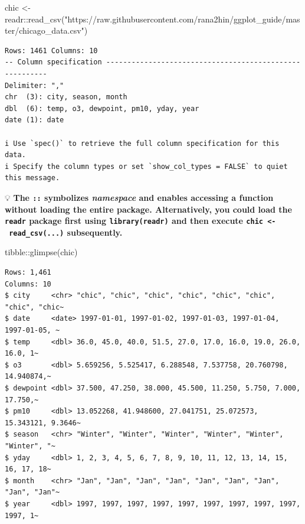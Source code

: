 \documentclass[
  letterpaper,
  DIV=11,
  numbers=noendperiod]{scrreprt}
\newenvironment{Shaded}{\begin{snugshade}}{\end{snugshade}}
\newcommand{\FunctionTok}[1]{\textcolor[rgb]{0.28,0.35,0.67}{#1}}
\newcommand{\NormalTok}[1]{\textcolor[rgb]{0.00,0.23,0.31}{#1}}
\newcommand{\OtherTok}[1]{\textcolor[rgb]{0.00,0.23,0.31}{#1}}
\newcommand{\SpecialCharTok}[1]{\textcolor[rgb]{0.37,0.37,0.37}{#1}}
\newcommand{\StringTok}[1]{\textcolor[rgb]{0.13,0.47,0.30}{#1}}
\begin{document}
\begin{Shaded}
\begin{Highlighting}[]
\NormalTok{chic }\OtherTok{\textless{}{-}}\NormalTok{ readr}\SpecialCharTok{::}\FunctionTok{read\_csv}\NormalTok{(}\StringTok{"https://raw.githubusercontent.com/rana2hin/ggplot\_guide/master/chicago\_data.csv"}\NormalTok{)}
\end{Highlighting}
\end{Shaded}

\begin{verbatim}
Rows: 1461 Columns: 10
-- Column specification --------------------------------------------------------
Delimiter: ","
chr  (3): city, season, month
dbl  (6): temp, o3, dewpoint, pm10, yday, year
date (1): date

i Use `spec()` to retrieve the full column specification for this data.
i Specify the column types or set `show_col_types = FALSE` to quiet this message.
\end{verbatim}

💡 \textbf{The \texttt{::} symbolizes \emph{namespace} and enables
accessing a function without loading the entire package. Alternatively,
you could load the \texttt{readr} package first using
\texttt{library(readr)} and then execute
\texttt{chic\ \textless{}-\ read\_csv(...)} subsequently.}

\begin{Shaded}
\begin{Highlighting}[]
\NormalTok{tibble}\SpecialCharTok{::}\FunctionTok{glimpse}\NormalTok{(chic)}
\end{Highlighting}
\end{Shaded}

\begin{verbatim}
Rows: 1,461
Columns: 10
$ city     <chr> "chic", "chic", "chic", "chic", "chic", "chic", "chic", "chic~
$ date     <date> 1997-01-01, 1997-01-02, 1997-01-03, 1997-01-04, 1997-01-05, ~
$ temp     <dbl> 36.0, 45.0, 40.0, 51.5, 27.0, 17.0, 16.0, 19.0, 26.0, 16.0, 1~
$ o3       <dbl> 5.659256, 5.525417, 6.288548, 7.537758, 20.760798, 14.940874,~
$ dewpoint <dbl> 37.500, 47.250, 38.000, 45.500, 11.250, 5.750, 7.000, 17.750,~
$ pm10     <dbl> 13.052268, 41.948600, 27.041751, 25.072573, 15.343121, 9.3646~
$ season   <chr> "Winter", "Winter", "Winter", "Winter", "Winter", "Winter", "~
$ yday     <dbl> 1, 2, 3, 4, 5, 6, 7, 8, 9, 10, 11, 12, 13, 14, 15, 16, 17, 18~
$ month    <chr> "Jan", "Jan", "Jan", "Jan", "Jan", "Jan", "Jan", "Jan", "Jan"~
$ year     <dbl> 1997, 1997, 1997, 1997, 1997, 1997, 1997, 1997, 1997, 1997, 1~
\end{verbatim}
\end{document}
